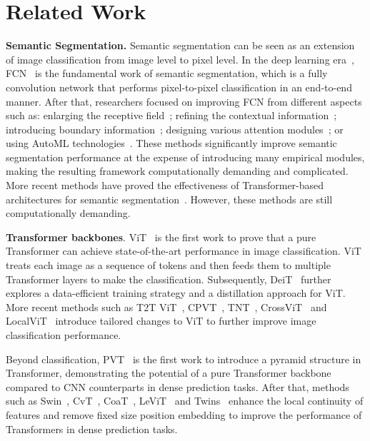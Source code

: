 \section{Related Work}

\textbf{Semantic Segmentation.} Semantic segmentation can be seen as an extension of image classification from image level to pixel level. In the deep learning era~\cite{resnet,krizhevsky2012imagenet,simonyan2014very,Li_2019_CVPR,wang2018_mix}, FCN~\cite{fcn} is the fundamental work of semantic segmentation, which is a fully convolution network that performs pixel-to-pixel classification in an end-to-end manner. After that, researchers focused on improving FCN from different aspects such as:  enlarging the receptive field~\cite{pspnet, denseaspp,largekernel,dilate,deeplab,deeplabv2,deeplabv3+}; refining the contextual information~\cite{ocnet,cpn,ocrnet,encnet,zhou2019context,refinenet,contextnet,cgnet,apcnet}; introducing boundary information~\cite{ding2019boundary,bertasius2016semantic,li2020improving,segfix,zhen2020joint,gatescnn,dfn,chen2016semantic}; designing various attention modules~\cite{danet,nonlocal,sanet,ccnet,pan,psanet,emanet,gcnet,trans2seg}; or using AutoML technologies~\cite{squeezenas,fasterseg,dynamicrouting,autodeeplab,nekrasov2019fast}. These methods significantly improve semantic segmentation performance at the expense of introducing many empirical modules, making the resulting framework computationally demanding and complicated. More recent methods have proved the effectiveness of Transformer-based architectures for semantic segmentation~\cite{setr,trans2seg}. However, these methods are still computationally demanding.

\textbf{Transformer backbones}. ViT~\cite{vit} is the first work to prove that a pure Transformer can achieve state-of-the-art performance in image classification. ViT treats each image as a sequence of tokens and then feeds them to multiple Transformer layers to make the classification.  Subsequently, DeiT~\cite{DETR} further explores a data-efficient training strategy and a distillation approach for ViT. More recent methods such as T2T ViT~\cite{yuan2021tokens}, CPVT~\cite{chu2021conditional}, TNT~\cite{han2021Transformer}, CrossViT~\cite{chen2021crossvit} and LocalViT~\cite{li2021localvit} introduce tailored changes to ViT to further improve image classification performance.

Beyond classification, PVT~\cite{pvt} is the first work to introduce a pyramid structure in Transformer, demonstrating the potential of a pure Transformer backbone compared to CNN counterparts in dense prediction tasks. After that, methods such as Swin~\cite{liu2021swin}, CvT~\cite{wu2021cvt}, CoaT~\cite{xu2021co}, LeViT~\cite{graham2021levit} and Twins~\cite{chu2021twins} enhance the local continuity of features and remove fixed size position embedding to improve the performance of Transformers in dense prediction tasks.


